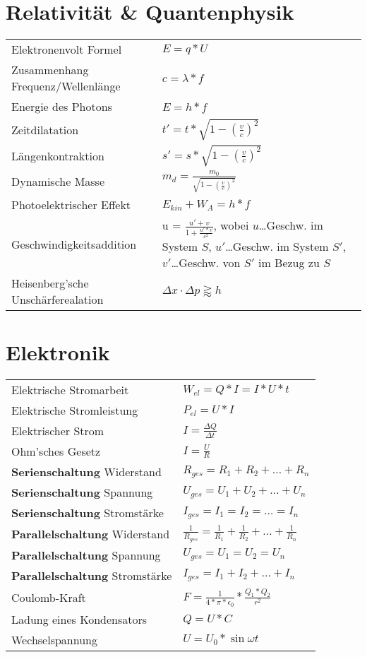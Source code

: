 \documentclass[12pt,a4paper]{paper}
\begin{document}
\section{Relativität \& Quantenphysik}
\begin{tabularx}{\textwidth}{X|X}
	Elektronenvolt Formel & $E=q*U$\\
Zusammenhang Frequenz/Wellenlänge & $c = \lambda * f$\\
Energie des Photons &  $E = h *f$\\
Zeitdilatation & $t' = t * \sqrt{1- (\frac{v}{c})^2}$\\
Längenkontraktion & $s' = s * \sqrt{1- (\frac{v}{c})^2}$\\
Dynamische Masse & $m_{d} = \frac{m_0}{\sqrt{1- (\frac{v}{c})^2}}$\\
Photoelektrischer Effekt & $E_{kin} + W_A=h*f$\\
Geschwindigkeitsaddition & u = $\frac{{u' + v}}{{1 + \frac{{u'  * v}}{{{c^2}}}}} $, wobei $u$\dots Geschw. im System $S$, $u'$\dots Geschw. im System $S'$, $v'$\dots Geschw. von $S'$ im Bezug zu $S$\\
Heisenberg'sche Unschärferealation & $\Delta x \cdot \Delta p \gtrapprox h $

\end{tabularx}
\section{Elektronik}
\begin{tabularx}{\textwidth}{X|X}
	Elektrische Stromarbeit & $ W_{el} = Q * I = I * U * t$\\
	Elektrische Stromleistung & $P_{el} = U * I$\\
	Elektrischer Strom & $I = \frac{\Delta Q}{\Delta t}$\\
	Ohm'sches Gesetz & $I=\frac{U}{R}$\\
	\textbf{Serienschaltung} Widerstand & $R_{ges} = R_1 + R_2 + \dots + R_n$\\
	\textbf{Serienschaltung} Spannung & $U_{ges} = U_1 + U_2 + \dots + U_n$\\
	\textbf{Serienschaltung} Stromstärke & $ I_{ges} = I_1 = I_2 = \dots  = I_n$\\

	\textbf{Parallelschaltung} Widerstand & $\frac{1}{R_{ges}} = \frac{1}{R_{1}} + \frac{1}{R_{2}} + \dots + \frac{1}{R_{n}}$\\
	\textbf{Parallelschaltung} Spannung & $U_{ges} = U_{1} = U_{2} = U_{n}$\\
	\textbf{Parallelschaltung} Stromstärke  & $I_{ges}=I_{1}+I_{2}+\dots+I_{n}$\\
	Coulomb-Kraft & $F = \frac{1}{4*\pi * \epsilon_{0}} * \frac{Q_1 * Q_2}{r^2}$\\
	Ladung eines Kondensators & $Q = U * C$\\
	Wechselspannung & $U = U_0 * \sin{\omega t}$\\
\end{tabularx}
\end{document}
